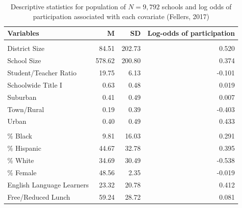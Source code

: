 \documentclass[
  english,
  man,floatsintext]{apa6}
\begin{document}
\begin{table}[!h]

\caption{\label{tab:tab-RGM-Pars}Descriptive statistics for population of $N = 9,792$ schools and log odds of participation associated with each covariate (Fellers, 2017)}
\centering
\begin{tabular}[t]{lrrr}
\toprule
Variables & M & SD & Log-odds of participation\\
\midrule
\addlinespace[0.3em]
\multicolumn{4}{l}{\textbf{School Data}}\\
\hspace{1em}District Size & 84.51 & 202.73 & 0.520\\
\hspace{1em}School Size & 578.62 & 200.80 & 0.374\\
\hspace{1em}Student/Teacher Ratio & 19.75 & 6.13 & -0.101\\
\hspace{1em}Schoolwide Title I & 0.63 & 0.48 & 0.019\\
\hspace{1em}Suburban & 0.41 & 0.49 & 0.007\\
\hspace{1em}Town/Rural & 0.19 & 0.39 & -0.403\\
\hspace{1em}Urban & 0.40 & 0.49 & 0.433\\
\addlinespace[0.3em]
\multicolumn{4}{l}{\textbf{Student Data}}\\
\hspace{1em}\% Black & 9.81 & 16.03 & 0.291\\
\hspace{1em}\% Hispanic & 44.67 & 32.78 & 0.395\\
\hspace{1em}\% White & 34.69 & 30.49 & -0.538\\
\hspace{1em}\% Female & 48.56 & 2.35 & -0.019\\
\hspace{1em}English Language Learners & 23.32 & 20.78 & 0.412\\
\hspace{1em}Free/Reduced Lunch & 59.24 & 28.72 & 0.081\\
\bottomrule
\end{tabular}
\end{table}
\end{document}
